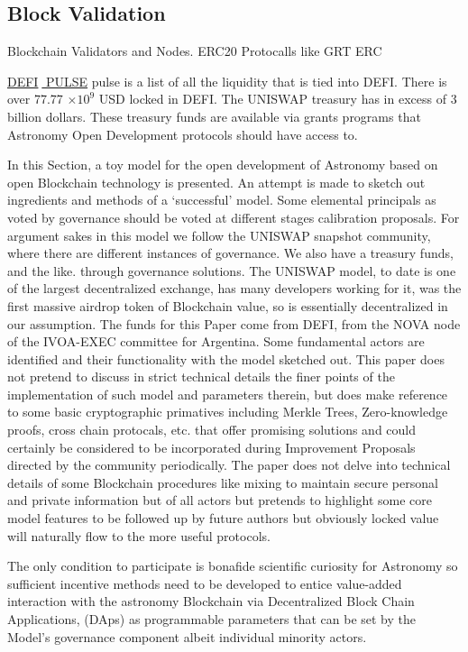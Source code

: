 \documentclass[final,5p,times,twocolumn,authoryear]{elsarticle}
\begin{document}
\subsection{Block Validation}
\label{subsec: validator}
Blockchain Validators and Nodes. ERC20 Protocalls like GRT ERC   

\href{https://defipulse.com/}{DEFI$\;$ PULSE} pulse is a list of all the liquidity that is tied into DEFI. There is over 77.77 $\times 10^{9}$ USD locked in DEFI. The UNISWAP treasury has in excess of 3 billion dollars. These treasury funds are available via grants programs that Astronomy Open Development protocols should have access to.

In this Section, a toy model for the open development of Astronomy based on open Blockchain technology is presented. An attempt is made to sketch out ingredients and methods of a `successful' model. Some elemental principals as voted by governance should be voted at different stages calibration proposals. For argument sakes in this model we follow the UNISWAP snapshot community, where there are different instances of governance. We also have a treasury funds, and the like.  through governance solutions. The UNISWAP model, to date is one of the largest decentralized exchange, has many developers working for it, was the first massive airdrop token of Blockchain value, so is essentially decentralized in our assumption. The funds for this Paper come from DEFI, from the NOVA node of the IVOA-EXEC committee for Argentina. Some fundamental actors are identified and their functionality with the model sketched out. This paper does not pretend to discuss in strict technical details the finer points of the implementation of such model and parameters therein, but does make reference to some basic cryptographic primatives including Merkle Trees, Zero-knowledge proofs, cross chain protocals, etc. that offer promising solutions and could certainly be considered to be incorporated during Improvement Proposals directed by the community periodically. The paper does not delve into technical details of some Blockchain procedures like mixing to maintain secure personal and private information but of all actors but pretends to highlight some core model features to be followed up by future authors but obviously  locked value will naturally flow to the more useful protocols.  
 
The only condition to participate is bonafide scientific curiosity for Astronomy so sufficient incentive methods need to be developed to entice value-added interaction with the astronomy Blockchain via Decentralized Block Chain Applications, (DAps) as programmable parameters that can be set by the Model's governance component albeit individual minority actors. 
\end{document}
